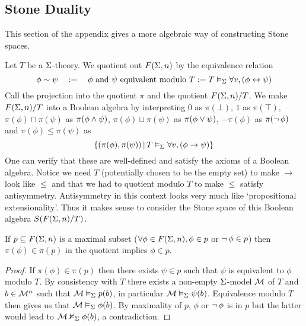 \subsection{Stone Duality}
This section of the appendix gives a more algebraic way of 
constructing Stone spaces.

\begin{dfn}
    Let $T$ be a $\Sigma$-theory.
    We quotient out $F(\Sigma,n)$ by the equivalence relation
    \[  
        \phi \sim \psi \quad := 
        \quad \phi \text{ and } \psi \text{ equivalent modulo } T
        := T \vDash_{\Sigma} \forall v, (\phi \leftrightarrow \psi)
    \]
    Call the projection into the quotient $\pi$
    and the quotient $F(\Sigma,n) / T$.
    We make $F(\Sigma,n) / T$ into a Boolean algebra by 
    interpreting $0$ as $\pi(\bot)$, $1$ as $\pi(\top)$, 
    $\pi(\phi) \sqcap \pi(\psi)$ as $\pi(\phi \land \psi)$,
    $\pi(\phi) \sqcup \pi(\psi)$ as $\pi(\phi \lor \psi)$,
    $- \pi(\phi)$ as $\pi(\neg\, \phi)$ and 
    $\pi(\phi) \leq \pi(\psi)$ as 
    \[\left\{(\pi(\phi),\pi(\psi)) \,|\, T \vDash_{\Sigma} \forall v, (\phi \to \psi)\right\}\]
    One can verify that these are well-defined and satisfy the axioms of 
    a Boolean algebra.
    Notice we need $T$ (potentially chosen to be the empty set) 
    to make $\to$ look like $\leq$ and that we had to quotient modulo $T$ 
    to make $\leq$ satisfy antisymmetry. 
    Antisymmetry in this context looks very much like 
    `propositional extensionality'.
    Thus it makes sense to consider the Stone space of this Boolean algebra 
    $S(F(\Sigma,n) / T)$.
\end{dfn}

\begin{lem}
    If $p \subseteq F(\Sigma,n)$ is a maximal subset 
    ($\forall \phi \in F(\Sigma,n), \phi \in p$ or $\neg\, \phi \in p$) then 
    $\pi(\phi) \in \pi(p)$ in the quotient implies $\phi \in p$.
\end{lem}
\begin{proof}
    If $\pi(\phi) \in \pi(p)$ then there exists $\psi \in p$ such that 
    $\psi$ is equivalent to $\phi$ modulo $T$.
    By consistency with $T$ there exists a non-empty $\Sigma$-model $\mathcal{M}$ of $T$
    and $b \in {\mathcal{M}}^n$ 
    such that $\mathcal{M} \vDash_{\Sigma} p(b)$, 
    in particular $\mathcal{M} \vDash_{\Sigma} \psi(b)$.
    Equivalence modulo $T$ then gives us that $\mathcal{M} \vDash_{\Sigma} \phi(b)$.
    By maximality of $p$, 
    $\phi$ or $\neg\, \phi$ is in $p$ but the latter would lead to 
    $\mathcal{M} \nvDash_{\Sigma} \phi(b)$, 
    a contradiction.
\end{proof}

